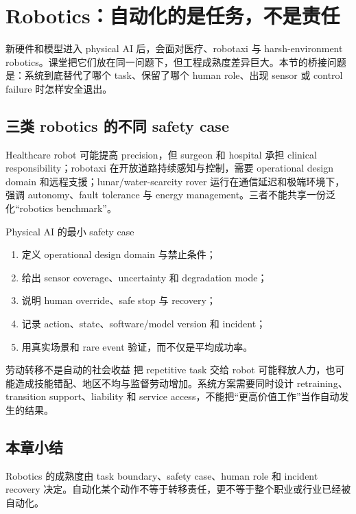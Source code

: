 \section{Robotics：自动化的是任务，不是责任}

新硬件和模型进入 physical AI 后，会面对医疗、robotaxi 与 harsh-environment robotics。课堂把它们放在同一问题下，但工程成熟度差异巨大。本节的桥接问题是：系统到底替代了哪个 task、保留了哪个 human role、出现 sensor 或 control failure 时怎样安全退出。

\subsection{三类 robotics 的不同 safety case}

Healthcare robot 可能提高 precision，但 surgeon 和 hospital 承担 clinical responsibility；robotaxi 在开放道路持续感知与控制，需要 operational design domain 和远程支援；lunar/water-scarcity rover 运行在通信延迟和极端环境下，强调 autonomy、fault tolerance 与 energy management。三者不能共享一份泛化“robotics benchmark”。

\begin{importantbox}{Physical AI 的最小 safety case}
\begin{enumerate}
  \item 定义 operational design domain 与禁止条件；
  \item 给出 sensor coverage、uncertainty 和 degradation mode；
  \item 说明 human override、safe stop 与 recovery；
  \item 记录 action、state、software/model version 和 incident；
  \item 用真实场景和 rare event 验证，而不仅是平均成功率。
\end{enumerate}
\end{importantbox}

\begin{warningbox}{劳动转移不是自动的社会收益}
把 repetitive task 交给 robot 可能释放人力，也可能造成技能错配、地区不均与监督劳动增加。系统方案需要同时设计 retraining、transition support、liability 和 service access，不能把“更高价值工作”当作自动发生的结果。
\end{warningbox}

\subsection{本章小结}

Robotics 的成熟度由 task boundary、safety case、human role 和 incident recovery 决定。自动化某个动作不等于转移责任，更不等于整个职业或行业已经被自动化。

